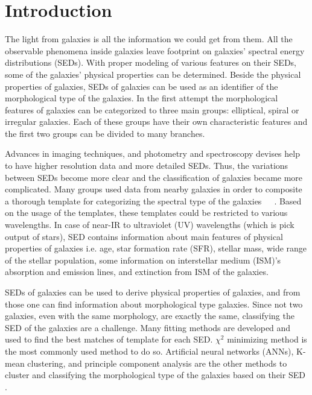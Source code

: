 \section{Introduction}
\label{sec: intro}
The light from galaxies is all the information we could get from them. 
All the observable phenomena inside galaxies leave footprint on galaxies' spectral energy distributions (SEDs).
With proper modeling of various features on their SEDs, some of the galaxies' physical properties can be determined.
Beside the physical properties of galaxies, SEDs of galaxies can be used as an identifier of the morphological type of the galaxies.
In the first attempt the morphological features of galaxies can be categorized to three main groups: elliptical, spiral or irregular galaxies.
Each of these groups have their own characteristic features and the first two groups can be divided to many branches.

Advances in imaging techniques, and photometry and spectroscopy devises help to have higher resolution data and more detailed SEDs. 
Thus, the variations between SEDs become more clear and the classification of galaxies became more complicated.
Many groups used data from nearby galaxies in order to composite a thorough template for categorizing the spectral type of the galaxies~\citep[e.g.][]{Kinney93}~\citep[][hereafter K96]{Kinney96}~\citep[][]{Bershady00,Mannucci01}.
Based on the usage of the templates, these templates could be restricted to various wavelengths.
In case of near-IR to ultraviolet (UV) wavelengths (which is pick output of stars), SED contains information about main features of physical properties of galaxies i.e. age, star formation rate (SFR), stellar mass, wide range of the stellar population, some information on interstellar medium (ISM)'s absorption and emission lines, and extinction from ISM of the galaxies.

SEDs of galaxies can be used to derive physical properties of galaxies, and from those one can find information about morphological type  galaxies.
Since not two galaxies, even with the same morphology, are exactly the same, classifying the SED of the galaxies are a challenge.
Many fitting methods are developed and used to find the best matches of template for each SED.
$\chi^2$ minimizing method is the most commonly used method to do so. 
Artificial neural networks (ANNs), K-mean clustering, and principle component analysis are the other methods to cluster and classifying the morphological type of the galaxies based on their SED \citep[e.g.][]{Allen13,Ordov14,Shi15}.

